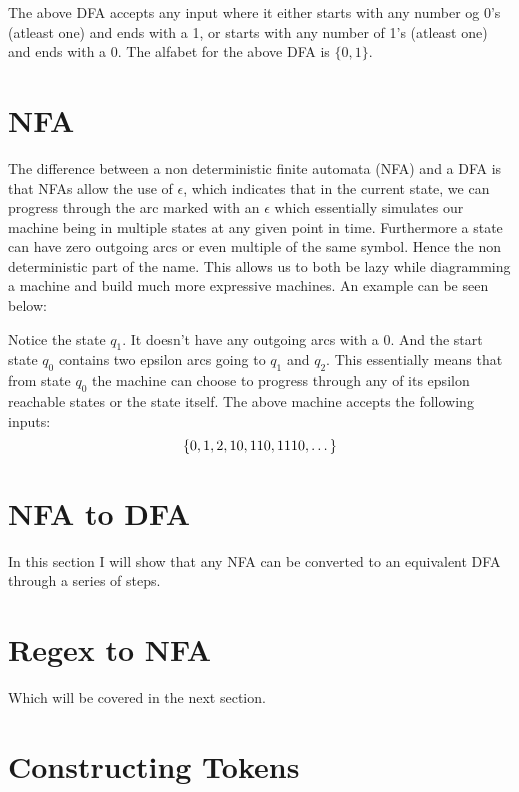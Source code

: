 The above DFA accepts any input where it either starts with any number og 0's (atleast one) and ends with a 1, or starts with any number of 1's (atleast one) and ends with a 0. The alfabet for the above DFA is $\{0, 1\}$.

\section*{NFA}

The difference between a non deterministic finite automata (NFA) and a DFA is that NFAs allow the use of $\epsilon$, which indicates that in the current state, we can progress through the arc marked with an $\epsilon$ which essentially simulates our machine being in multiple states at any given point in time. Furthermore a state can have zero outgoing arcs or even multiple of the same symbol. Hence the non deterministic part of the name. This allows us to both be lazy while diagramming a machine and build much more expressive machines. An example can be seen below:


\begin{center}
\end{center}

Notice the state $q_1$. It doesn't have any outgoing arcs with a $0$. And the start state $q_0$ contains two epsilon arcs going to $q_1$ and $q_2$. This essentially means that from state $q_0$ the machine can choose to progress through any of its epsilon reachable states or the state itself. The above machine accepts the following inputs:
\[\left\{0, 1, 2, 10, 110, 1110, \dots\right\}\]

\section*{NFA to DFA}

In this section I will show that any NFA can be converted to an equivalent DFA through a series of steps.

\section*{Regex to NFA}
Which will be covered in the next section.

\section*{Constructing Tokens}


